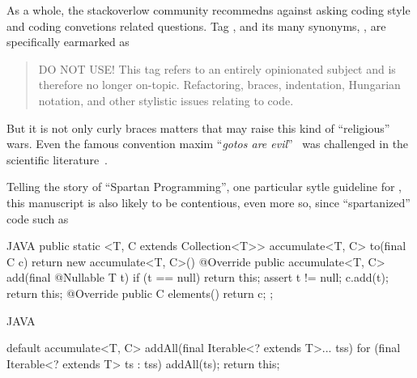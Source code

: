 As a whole, the stackoverlow community 
recommedns against asking coding style and coding convetions related questions. 
Tag , and its many synonyms, , 
 are specifically 
earmarked as 
\begin{quote}
DO NOT USE! This tag refers to an entirely opinionated subject and is therefore 
no longer on-topic. Refactoring, braces, indentation, Hungarian notation, and 
other stylistic issues relating to code. 
\end{quote}
But it is not only curly braces matters that may raise 
this kind of ``religious'' wars. Even the famous convention maxim ``\emph{gotos 
are evil}''~\cite{Dijksta:must be in bib} was challenged in the scientific 
literature~\cite{Knuth: and there are several others}.

Telling the story of ``Spartan Programming'', one particular sytle guideline for 
\Java, this manuscript is also likely to be contentious, even more so, since 
``spartanized'' code such as 
\begin{code}{JAVA}
  public static <T, C extends Collection<T>> 
                                accumulate<T, C> to(final C c) {
    return new accumulate<T, C>() {
      @Override public accumulate<T, C> add(final @Nullable T t) {
        if (t == null)
          return this;
        assert t != null;
        c.add(t);
        return this;
      }
      @Override public C elements() {
        return c;
      }
    };
  }
  \end{code}

\begin{code}{JAVA}

default accumulate<T, C> addAll(final Iterable<? extends T>... tss) {
  for (final Iterable<? extends T> ts : tss)
    addAll(ts);
  return this;
}
 
\end{code}


